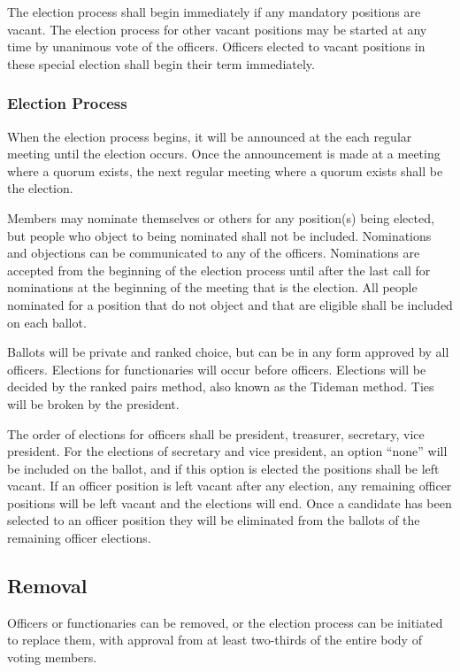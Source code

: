 \documentclass{article}
\begin{document}
The election process shall begin immediately if any mandatory positions are
vacant. The election process for other vacant positions may be started at any
time by unanimous vote of the officers. Officers elected to vacant positions in
these special election shall begin their term immediately.

\subsubsection{Election Process}

When the election process begins, it will be announced at the each regular
meeting until the election occurs. Once the announcement is made at a meeting
where a quorum exists, the next regular meeting where a quorum exists shall be
the election.

Members may nominate themselves or others for any position(s) being elected, but
people who object to being nominated shall not be included. Nominations and
objections can be communicated to any of the officers. Nominations are accepted
from the beginning of the election process until after the last call for
nominations at the beginning of the meeting that is the election. All people
nominated for a position that do not object and that are eligible shall be
included on each ballot.

Ballots will be private and ranked choice, but can be in any form approved by
all officers. Elections for functionaries will occur before officers. Elections
will be decided by the ranked pairs method, also known as the Tideman method.
Ties will be broken by the president.

The order of elections for officers shall be president, treasurer, secretary,
vice president. For the elections of secretary and vice president, an option
``none'' will be included on the ballot, and if this option is elected the
positions shall be left vacant. If an officer position is left vacant after any
election, any remaining officer positions will be left vacant and the elections
will end. Once a candidate has been selected to an officer position they will be
eliminated from the ballots of the remaining officer elections.

\subsection{Removal}

Officers or functionaries can be removed, or the election process can be
initiated to replace them, with approval from at least two-thirds of the entire
body of voting members.
\end{document}
